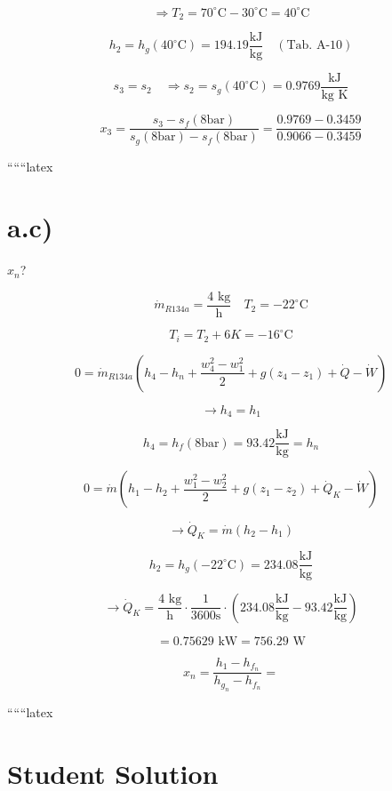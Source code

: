 \[
\Rightarrow T_2 = 70^\circ \text{C} - 30^\circ \text{C} = 40^\circ \text{C}
\]

\[
h_2 = h_g (40^\circ \text{C}) = 194.19 \frac{\text{kJ}}{\text{kg}} \quad (\text{Tab. A-10})
\]

\[
s_3 = s_2 \quad \Rightarrow s_2 = s_g (40^\circ \text{C}) = 0.9769 \frac{\text{kJ}}{\text{kg K}}
\]

\[
x_3 = \frac{s_3 - s_f (8 \text{bar})}{s_g (8 \text{bar}) - s_f (8 \text{bar})} = \frac{0.9769 - 0.3459}{0.9066 - 0.3459}
\]

``````latex

\section*{a.c)}
$x_n$?

\[
\dot{m}_{R134a} = \frac{4 \text{ kg}}{\text{h}} \quad T_2 = -22^\circ \text{C}
\]

\[
T_i = T_2 + 6K = -16^\circ \text{C}
\]


\[
0 = \dot{m}_{R134a} \left( h_4 - h_n + \frac{w_4^2 - w_1^2}{2} + g (z_4 - z_1) + \dot{Q} - \dot{W} \right)
\]

\[
\rightarrow h_4 = h_1
\]

\[
h_4 = h_f (8 \text{bar}) = 93.42 \frac{\text{kJ}}{\text{kg}} = h_n
\]


\[
0 = \dot{m} \left( h_1 - h_2 + \frac{w_1^2 - w_2^2}{2} + g (z_1 - z_2) + \dot{Q}_K - \dot{W} \right)
\]

\[
\rightarrow \dot{Q}_K = \dot{m} (h_2 - h_1)
\]

\[
h_2 = h_g \left( -22^\circ \text{C} \right) = 234.08 \frac{\text{kJ}}{\text{kg}}
\]

\[
\rightarrow \dot{Q}_K = \frac{4 \text{ kg}}{\text{h}} \cdot \frac{1}{3600 \text{s}} \cdot \left( 234.08 \frac{\text{kJ}}{\text{kg}} - 93.42 \frac{\text{kJ}}{\text{kg}} \right)
\]

\[
= 0.75629 \text{ kW} = 756.29 \text{ W}
\]

\[
x_n = \frac{h_1 - h_{f_n}}{h_{g_n} - h_{f_n}} =
\]

``````latex


\section*{Student Solution}

